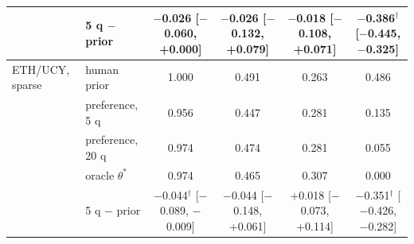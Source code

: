 \begin{table}[t]
{\begin{tabular}{llcccc}
 & 5 q $-$ prior & $-$0.026 \scriptsize{[$-$0.060, +0.000]} & $-$0.026 \scriptsize{[$-$0.132, +0.079]} & $-$0.018 \scriptsize{[$-$0.108, +0.071]} & $-$0.386$^\dagger$ \scriptsize{[$-$0.445, $-$0.325]} \\
\midrule
ETH/UCY, sparse & human prior & 1.000 & 0.491 & 0.263 & 0.486 \\
 & preference, 5 q & 0.956 & 0.447 & 0.281 & 0.135 \\
 & preference, 20 q & 0.974 & 0.474 & 0.281 & 0.055 \\
 & oracle $\theta^*$ & 0.974 & 0.465 & 0.307 & 0.000 \\
 & 5 q $-$ prior & $-$0.044$^\dagger$ \scriptsize{[$-$0.089, $-$0.009]} & $-$0.044 \scriptsize{[$-$0.148, +0.061]} & +0.018 \scriptsize{[$-$0.073, +0.114]} & $-$0.351$^\dagger$ \scriptsize{[$-$0.426, $-$0.282]} \\
\bottomrule
\end{tabular}}
\end{table}
